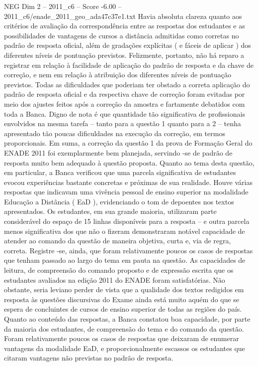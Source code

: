 \begin{textsample}{NEG Dim 2 – 2011\_c6 – Score -6.00 – 2011\_c6/enade\_2011\_geo\_ada47c37e1.txt}
Havia absoluta clareza quanto aos critérios de avaliação da correspondência entre as respostas dos estudantes e as possibilidades de vantagens de cursos a distância admitidas como corretas no padrão de resposta oficial, além de gradações explícitas ( e fáceis de aplicar ) dos diferentes níveis de pontuação previstos.
Felizmente, portanto, não há reparo a registrar em relação à facilidade de aplicação do padrão de resposta e da chave de correção, e nem em relação à atribuição dos diferentes níveis de pontuação previstos.
Todas as dificuldades que poderiam ter obstado a correta aplicação do padrão de resposta oficial e da respectiva chave de correção foram evitadas por meio dos ajustes feitos após a correção da amostra e fartamente debatidos com toda a Banca.
Digno de nota é que quantidade tão significativa de profissionais envolvidos na mesma tarefa – tanto para a questão 1 quanto para a 2 – tenha apresentado tão poucas dificuldades na execução da correção, em termos proporcionais.
Em suma, a correção da questão 1 da prova de Formação Geral do ENADE 2011 foi exemplarmente bem planejada, servindo -se de padrão de resposta muito bem adequado à questão proposta.
Quanto ao tema desta questão, em particular, a Banca verificou que uma parcela significativa de estudantes evocou experiências bastante concretas e próximas de sua realidade.
Houve várias respostas que indicavam uma vivência pessoal de ensino superior na modalidade Educação a Distância ( EaD ), evidenciando o tom de depoentes nos textos apresentados.
Os estudantes, em sua grande maioria, utilizaram parte considerável do espaço de 15 linhas disponíveis para a resposta – e outra parcela menos significativa dos que não o fizeram demonstraram notável capacidade de atender ao comando da questão de maneira objetiva, curta e, via de regra, correta.
Registre -se, ainda, que foram relativamente poucos os casos de respostas que tenham passado ao largo do tema em pauta na questão.
As capacidades de leitura, de compreensão do comando proposto e de expressão escrita que os estudantes avaliados na edição 2011 do ENADE foram satisfatórias.
Não obstante, seria leviano perder de vista que a qualidade dos textos redigidos em resposta às questões discursivas do Exame ainda está muito aquém do que se espera de concluintes de cursos de ensino superior de todas as regiões do país.
Quanto ao conteúdo das respostas, a Banca constatou boa capacidade, por parte da maioria dos estudantes, de compreensão do tema e do comando da questão.
Foram relativamente poucos os casos de respostas que deixaram de enumerar vantagens da modalidade EaD, e proporcionalmente escassos os estudantes que citaram vantagens não previstas no padrão de resposta.

\end{textsample}

